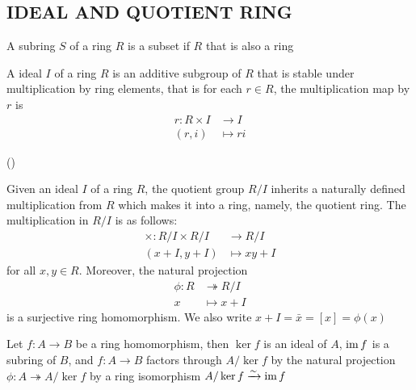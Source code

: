 \subsection{IDEAL AND QUOTIENT RING}

\begin{definition}[subring]
	A subring $S$ of a ring $R$ is a subset if $R$ that is also a ring
\end{definition}

\begin{definition}[ideal]
	A ideal $I$ of a ring $R$ is an additive subgroup of $R$ that is stable under multiplication by ring elements, that is for each $r \in R$, the multiplication map by $r$ is
	\begin{align*}
		r : R \times I &\to I \\
			(r, i) &\mapsto ri
	\end{align*}
	
	()
\end{definition}

\begin{definition}
	Given an ideal $I$ of a ring $R$, the quotient group $R / I$ inherits a naturally defined multiplication from $R$ which makes it into a ring, namely, the quotient ring. The multiplication in $R / I$ is as follows:
	\begin{align*}
		\times: R / I \times R / I &\to R / I \\
		(x + I, y + I) &\mapsto xy + I
	\end{align*}
	for all $x, y \in R$. Moreover, the natural projection 
	\begin{align*}
		\phi: R &\twoheadrightarrow R / I \\
				x &\mapsto x + I
	\end{align*}
	is a surjective ring homomorphism. We also write $x + I = \bar{x} = [x] = \phi(x)$
\end{definition}

\begin{theorem}
	Let $f: A \to B$ be a ring homomorphism, then $\ker f$ is an ideal of $A$, $\operatorname{im} f$ is a subring of $B$, and $f: A \to B$ factors through $A / \ker f$ by the natural projection $\phi: A \twoheadrightarrow A / \ker f$ by a ring isomorphism $A / \ker f \xrightarrow{\sim} \operatorname{im} f$
	\begin{center}
	\end{center}
\end{theorem}

